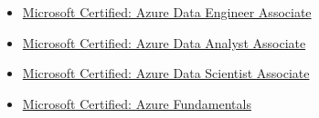 \documentclass[letterpaper,11pt]{article}
\begin{document}
\begin{itemize}
	\item \href{https://www.credly.com/badges/6b30cb69-ac54-4abc-b26d-61deef5c2a4c/public_url}{Microsoft Certified: Azure Data Engineer Associate}
	\item \href{https://www.credly.com/badges/36381c2d-87cc-445b-a174-b1431604a0f5/public_url}{Microsoft Certified: Azure Data Analyst Associate}
	\item \href{https://www.credly.com/badges/209afd56-075a-42e3-9ce8-88c8bc05aae5/public_url}{Microsoft Certified: Azure Data Scientist Associate}
	\item \href{https://www.credly.com/badges/1d886867-8f7b-45d5-b2ee-5416127e3d36/public_url}{Microsoft Certified: Azure Fundamentals}
\end{itemize}
\end{document}
